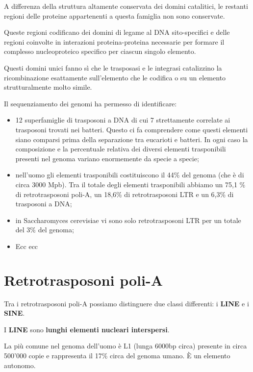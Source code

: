 \documentclass[11pt]{book}
\begin{document}
A differenza della struttura altamente conservata dei domini catalitici,
le restanti regioni delle proteine appartenenti a questa famiglia non
sono conservate.

Queste regioni codificano dei domini di legame al DNA sito-specifici e
delle regioni coinvolte in interazioni proteina-proteina necessarie per
formare il complesso nucleoproteico specifico per ciascun singolo
elemento.

Questi domini unici fanno sì che le trasposasi e le integrasi
catalizzino la ricombinazione esattamente sull'elemento che le codifica
o su un elemento strutturalmente molto simile.

Il sequenziamento dei genomi ha permesso di identificare:

\begin{itemize}
\itemsep1pt\parskip0pt
\item
  12 superfamiglie di trasposoni a DNA di cui 7 strettamente correlate
  ai trasposoni trovati nei batteri. Questo ci fa comprendere come
  questi elementi siano comparsi prima della separazione tra eucarioti e
  batteri. In ogni caso la composizione e la percentuale relativa dei
  diversi elementi trasponibili presenti nel genoma variano enormemente
  da specie a specie;
\item
  nell'uomo gli elementi trasponibili costituiscono il 44\% del genoma
  (che è di circa 3000 Mpb). Tra il totale degli elementi trasponibili
  abbiamo un 75,1 \% di retrotrasposoni poli-A, un 18,6\% di
  retrotrasposoni LTR e un 6,3\% di trasposoni a DNA;
\item
  in Saccharomyces cerevisiae vi sono solo retrotrasposoni LTR per un
  totale del 3\% del genoma;
\item
  Ecc ecc
\end{itemize}

\section{Retrotrasposoni poli-A}\label{retrotrasposoni-poli-a-1}

Tra i retrotrasposoni poli-A possiamo distinguere due classi differenti:
i \textbf{LINE} e i \textbf{SINE}.

I \textbf{LINE} sono \textbf{lunghi elementi nucleari interspersi}.

La più comune nel genoma dell'uomo è L1 (lunga 6000bp circa) presente in
circa 500'000 copie e rappresenta il 17\% circa del genoma umano. È un
elemento autonomo.
\end{document}
